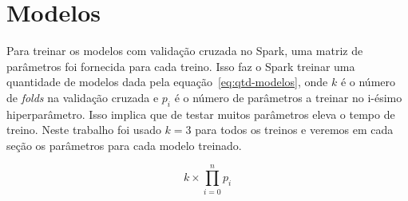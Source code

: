 \chapter{Modelos}
\label{ch:modelos}

Para treinar os modelos com validação cruzada no Spark, uma matriz de parâmetros foi fornecida para cada treino.
Isso faz o Spark treinar uma quantidade de modelos dada pela equação~\ref{eq:qtd-modelos}, onde $k$ é o número de \textit{folds} na validação cruzada e $p_{i}$ é o número de parâmetros a treinar no i-ésimo hiperparâmetro.
Isso implica que de testar muitos parâmetros eleva o tempo de treino.
Neste trabalho foi usado $k = 3$ para todos os treinos e veremos em cada seção os parâmetros para cada modelo treinado.

\begin{equation}
    \label{eq:qtd-modelos}
    k \times \prod_{i=0}^{n} p_i
\end{equation}








